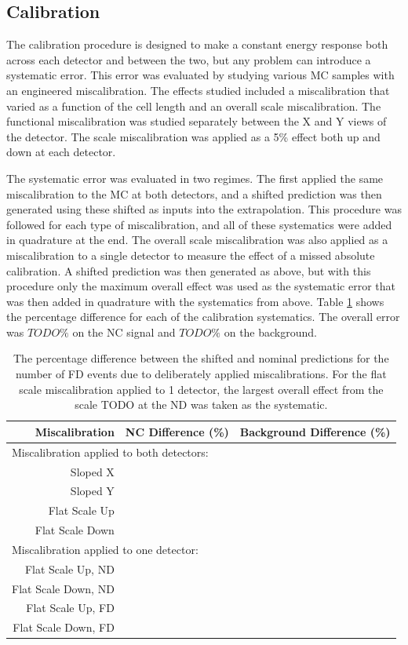 \subsection{Calibration}

The calibration procedure is designed to make a constant energy response both across each detector and between the two, but any problem can introduce a systematic error. This error was evaluated by studying various MC samples with an engineered miscalibration. The effects studied included a miscalibration that varied as a function of the cell length and an overall scale miscalibration. The functional miscalibration was studied separately between the X and Y views of the detector. The scale miscalibration was applied as a 5\% effect both up and down at each detector.

The systematic error was evaluated in two regimes. The first applied the same miscalibration to the MC at both detectors, and a shifted prediction was then generated using these shifted as inputs into the extrapolation. This procedure was followed for each type of miscalibration, and all of these systematics were added in quadrature at the end. The overall scale miscalibration was also applied as a miscalibration to a single detector to measure the effect of a missed absolute calibration. A shifted prediction was then generated as above, but with this procedure only the maximum overall effect was used as the systematic error that was then added in quadrature with the systematics from above. Table \ref{tab:SystCalib} shows the percentage difference for each of the calibration systematics. The overall error was $TODO\%$ on the NC signal and $TODO\%$ on the background.
\begin{table}[h]
  \begin{center}
    \caption[Calibration Systematic Errors]{The percentage difference between the shifted and nominal predictions for the number of FD events due to deliberately applied miscalibrations. For the flat scale miscalibration applied to 1 detector, the largest overall effect from the scale TODO at the ND was taken as the systematic.}
    \label{tab:SystCalib}
    \begin{tabular}{r c c}
      \hline\hline
      Miscalibration & NC Difference (\%) & Background Difference (\%) \\
      \hline
      \multicolumn{3}{l}{Miscalibration applied to both detectors:} \\
      Sloped X & & \\
      Sloped Y & & \\
      Flat Scale Up & & \\
      Flat Scale Down & & \\
      \multicolumn{3}{l}{Miscalibration applied to one detector:} \\
      Flat Scale Up, ND & & \\
      Flat Scale Down, ND & & \\
      Flat Scale Up, FD & & \\
      Flat Scale Down, FD & & \\
      \hline
    \end{tabular}
  \end{center}
\end{table}

